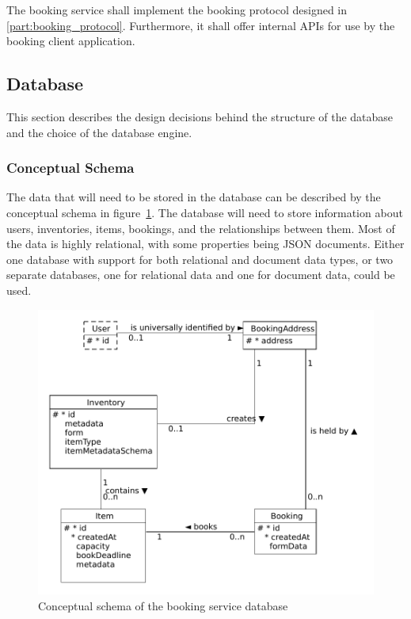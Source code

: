 The booking service shall implement the booking protocol designed in \ref{part:booking_protocol}. Furthermore, it shall offer internal APIs for use by the booking client application.

\subsection{Database}
\label{part:booking_service_database}

This section describes the design decisions behind the structure of the database and the choice of the database engine.

\subsubsection{Conceptual Schema}
\label{part:conceptual_schema}

The data that will need to be stored in the database can be described by the conceptual schema in figure~\ref{fig:db_conceptual_schema}. The database will need to store information about users, inventories, items, bookings, and the relationships between them. Most of the data is highly relational, with some properties being JSON documents. Either one database with support for both relational and document data types, or two separate databases, one for relational data and one for document data, could be used.

\begin{figure}
    \centering
    \includegraphics[width=1.0\textwidth]{content/design/db_conceptual_schema.uxf.svg.pdf}
    \caption[Conceptual schema of the booking service database]{Conceptual schema of the booking service database}
    \label{fig:db_conceptual_schema}
\end{figure}

